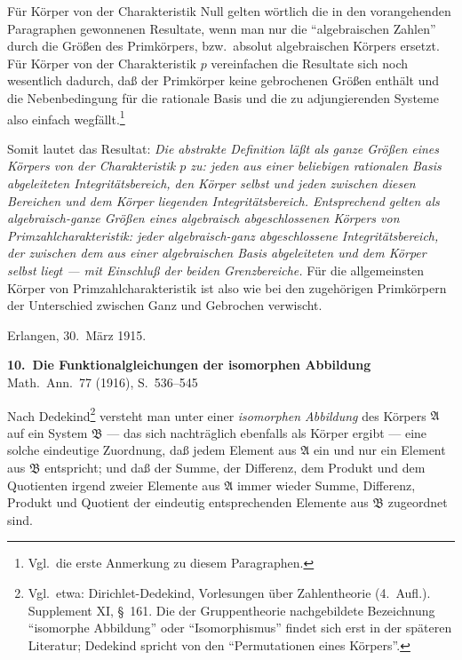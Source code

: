 \documentclass[12pt,a4paper]{article}
\begin{document}
F\"ur K\"orper von der Charakteristik Null gelten w\"ortlich die in den vorangehenden Paragraphen gewonnenen Resultate, wenn man nur die ``algebraischen Zahlen'' durch die Gr\"o\ss en des Primk\"orpers, bzw.\ absolut algebraischen K\"orpers ersetzt. F\"ur K\"orper von der Charakteristik $p$ vereinfachen die Resultate sich noch wesentlich dadurch, da\ss{} der Primk\"orper keine gebrochenen Gr\"o\ss en enth\"alt und die Nebenbedingung f\"ur die rationale Basis und die zu adjungierenden Systeme also einfach wegf\"allt.\footnote{Vgl.\ die erste Anmerkung zu diesem Paragraphen.}

Somit lautet das Resultat: \emph{Die abstrakte Definition l\"a\ss t als ganze Gr\"o\ss en eines K\"orpers von der Charakteristik $p$ zu: jeden aus einer beliebigen rationalen Basis abgeleiteten Integrit\"atsbereich, den K\"orper selbst und jeden zwischen diesen Bereichen und dem K\"orper liegenden Integrit\"atsbereich. Entsprechend gelten als algebraisch-ganze Gr\"o\ss en eines algebraisch abgeschlossenen K\"orpers von Primzahlcharakteristik: jeder algebraisch-ganz abgeschlossene Integrit\"atsbereich, der zwischen dem aus einer algebraischen Basis abgeleiteten und dem K\"orper selbst liegt --- mit Einschlu\ss{} der beiden Grenzbereiche.} F\"ur die allgemeinsten K\"orper von Primzahlcharakteristik ist also wie bei den zugeh\"origen Primk\"orpern der Unterschied zwischen Ganz und Gebrochen verwischt.

\vspace{2em}
\begin{flushright}
Erlangen, 30.\ M\"arz 1915.
\end{flushright}

\newpage
\begin{center}
\textbf{10.\ Die Funktionalgleichungen der isomorphen Abbildung}\\[0.5em]
\small Math.\ Ann.\ 77 (1916), S.~536--545
\end{center}

\vspace{1em}

Nach Dedekind\footnote{Vgl.\ etwa: Dirichlet-Dedekind, Vorlesungen \"uber Zahlentheorie (4.\ Aufl.). Supplement XI, \S\ 161. Die der Gruppentheorie nachgebildete Bezeichnung ``isomorphe Abbildung'' oder ``Isomorphismus'' findet sich erst in der sp\"ateren Literatur; Dedekind spricht von den ``Permutationen eines K\"orpers''.} versteht man unter einer \emph{isomorphen Abbildung} des K\"orpers $\mathfrak{A}$ auf ein System $\mathfrak{B}$ --- das sich nachtr\"aglich ebenfalls als K\"orper ergibt --- eine solche eindeutige Zuordnung, da\ss{} jedem Element aus $\mathfrak{A}$ ein und nur ein Element aus $\mathfrak{B}$ entspricht; und da\ss{} der Summe, der Differenz, dem Produkt und dem Quotienten irgend zweier Elemente aus $\mathfrak{A}$ immer wieder Summe, Differenz, Produkt und Quotient der eindeutig entsprechenden Elemente aus $\mathfrak{B}$ zugeordnet sind.
\end{document}
